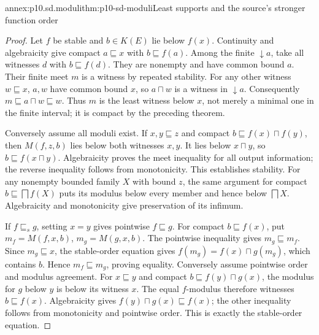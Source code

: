 \begin{annexitem}{annex:p10.sd.moduli}{thm:p10-sd-moduli}{Least supports and the source's stronger function order}
\begin{proof}
Let \(f\) be stable and \(b\in K(E)\) lie below \(f(x)\).
Continuity and algebraicity give compact \(a\sqsubseteq x\) with
\(b\sqsubseteq f(a)\). Among the finite \(\downarrow a\), take
all witnesses \(d\) with \(b\sqsubseteq f(d)\). They are nonempty
and have common bound \(a\). Their finite meet \(m\) is a witness
by repeated stability. For any other witness \(w\sqsubseteq x\),
\(a,w\) have common bound \(x\), so \(a\sqcap w\) is a witness
in \(\downarrow a\). Consequently \(m\sqsubseteq a\sqcap w\sqsubseteq w\).
Thus \(m\) is the least witness below \(x\), not merely a minimal
one in the finite interval; it is compact by the preceding theorem.

Conversely assume all moduli exist. If \(x,y\sqsubseteq z\) and
compact \(b\sqsubseteq f(x)\sqcap f(y)\), then \(M(f,z,b)\) lies
below both witnesses \(x,y\). It lies below \(x\sqcap y\), so
\(b\sqsubseteq f(x\sqcap y)\). Algebraicity proves the meet inequality
for all output information; the reverse inequality follows from
monotonicity. This establishes stability. For any nonempty bounded
family \(X\) with bound \(z\), the same argument for compact
\(b\sqsubseteq\bigsqcap f(X)\) puts its modulus below every member
and hence below \(\bigsqcap X\). Algebraicity and monotonicity give
preservation of its infimum.

If \(f\sqsubseteq_s g\), setting \(x=y\) gives pointwise
\(f\sqsubseteq g\). For compact \(b\sqsubseteq f(x)\), put
\(m_f=M(f,x,b)\), \(m_g=M(g,x,b)\). The pointwise inequality gives
\(m_g\sqsubseteq m_f\). Since \(m_g\sqsubseteq x\), the stable-order
equation gives \(f(m_g)=f(x)\sqcap g(m_g)\), which contains \(b\).
Hence \(m_f\sqsubseteq m_g\), proving equality.
Conversely assume pointwise order and modulus agreement. For
\(x\sqsubseteq y\) and compact \(b\sqsubseteq f(y)\sqcap g(x)\),
the modulus for \(g\) below \(y\) is below its witness \(x\).
The equal \(f\)-modulus therefore witnesses \(b\sqsubseteq f(x)\).
Algebraicity gives \(f(y)\sqcap g(x)\sqsubseteq f(x)\); the other
inequality follows from monotonicity and pointwise order. This is exactly
the stable-order equation.
\end{proof}
\end{annexitem}

